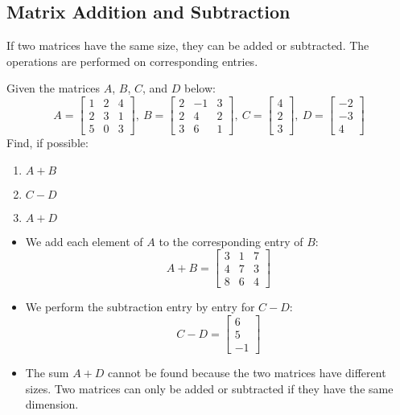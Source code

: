 \subsection{Matrix Addition and Subtraction}

If two matrices have the same size, they can be added or subtracted. The operations are performed on corresponding entries.

\begin{example}
    Given the matrices $A$, $B$, $C$, and $D$ below:
    \[
        A = \begin{bmatrix} 1 & 2 & 4 \\ 2 & 3 & 1 \\ 5 & 0 & 3 \end{bmatrix},\
        B = \begin{bmatrix} 2 & -1 & 3 \\ 2 & 4 & 2 \\ 3 & 6 & 1 \end{bmatrix},\
        C = \begin{bmatrix} 4 \\ 2 \\ 3 \end{bmatrix},\
        D = \begin{bmatrix} -2 \\ -3 \\ 4 \end{bmatrix}
    \]
    Find, if possible:
    \begin{enumerate}
        \item $A + B$
        \item $C - D$
        \item $A + D$
    \end{enumerate}
\end{example}

\begin{solution}
    \begin{itemize}


        \item We add each element of $A$ to the corresponding entry of $B$:
              \[
                  A + B = \begin{bmatrix} 3 & 1 & 7 \\ 4 & 7 & 3 \\ 8 & 6 & 4 \end{bmatrix}
              \]
        \item We perform the subtraction entry by entry for $C - D$:
              \[
                  C - D = \begin{bmatrix} 6 \\ 5 \\ -1 \end{bmatrix}
              \]
        \item The sum $A + D$ cannot be found because the two matrices have different sizes. Two matrices can only be added or subtracted if they have the same dimension.
    \end{itemize}
\end{solution}


